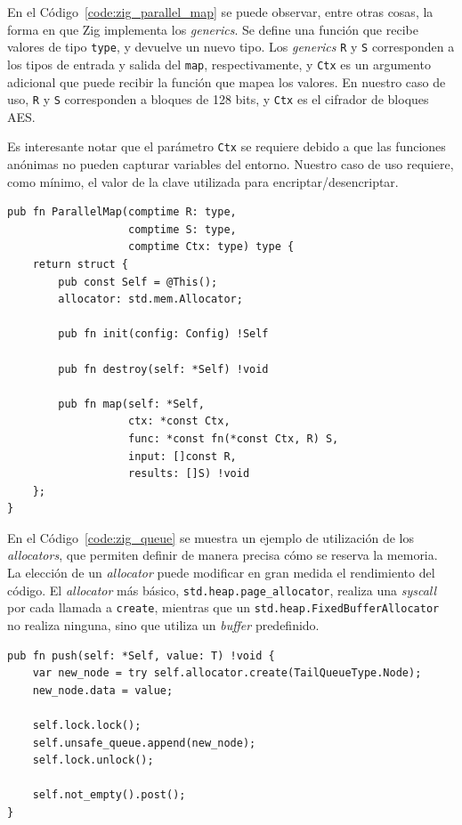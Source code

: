 \documentclass[11pt]{article}
\newcommand{\english}[1]{\textit{#1}}
\begin{document}
En el Código~\ref{code:zig_parallel_map} se puede observar, entre otras cosas, la forma en que Zig implementa los \english{generics}. Se define una función que recibe valores de tipo \lstinline{type}, y devuelve un nuevo tipo. Los \english{generics} \lstinline{R} y \lstinline{S} corresponden a los tipos de entrada y salida del \lstinline{map}, respectivamente, y \lstinline{Ctx} es un argumento adicional que puede recibir la función que mapea los valores. En nuestro caso de uso, \lstinline{R} y \lstinline{S} corresponden a bloques de 128 bits, y \lstinline{Ctx} es el cifrador de bloques AES. 

Es interesante notar que el parámetro \lstinline{Ctx} se requiere debido a que las funciones anónimas no pueden capturar variables del entorno. Nuestro caso de uso requiere, como mínimo, el valor de la clave utilizada para encriptar/desencriptar.

\begin{listing}[h]
\begin{verbatim}
pub fn ParallelMap(comptime R: type,
                   comptime S: type,
                   comptime Ctx: type) type {
    return struct {
        pub const Self = @This();
        allocator: std.mem.Allocator;

        pub fn init(config: Config) !Self

        pub fn destroy(self: *Self) !void

        pub fn map(self: *Self,
                   ctx: *const Ctx,
                   func: *const fn(*const Ctx, R) S,
                   input: []const R,
                   results: []S) !void
    };
}
\end{verbatim}
\caption{Definición abreviada del \lstinline{ParallelMap} en Zig}
\label{code:zig_parallel_map}
\end{listing}

En el Código~\ref{code:zig_queue} se muestra un ejemplo de utilización de los \english{allocators}, que permiten definir de manera precisa cómo se reserva la memoria. La elección de un \english{allocator} puede modificar en gran medida el rendimiento del código. El \english{allocator} más básico, \lstinline{std.heap.page_allocator}, realiza una \english{syscall} por cada llamada a \lstinline{create}, mientras que un \lstinline{std.heap.FixedBufferAllocator} no realiza ninguna, sino que utiliza un \english{buffer} predefinido.

\begin{listing}[h]
\begin{verbatim}
pub fn push(self: *Self, value: T) !void {
    var new_node = try self.allocator.create(TailQueueType.Node);
    new_node.data = value;

    self.lock.lock();
    self.unsafe_queue.append(new_node);
    self.lock.unlock();

    self.not_empty().post();
}
\end{verbatim}
\caption{Implementación del método \lstinline{push} de la \english{Queue} \english{thread-safe} en Zig}
\label{code:zig_queue}
\end{listing}
\end{document}
